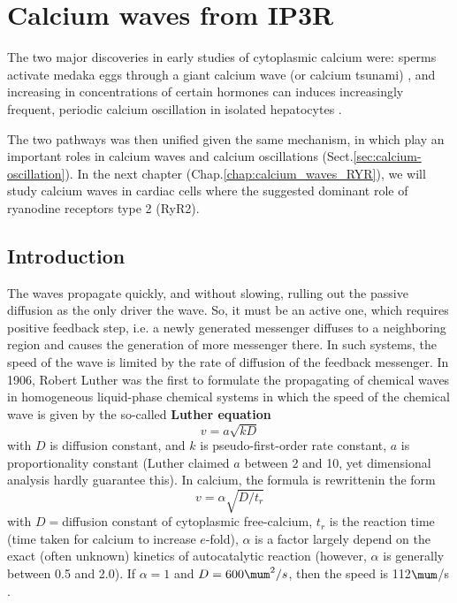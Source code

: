 \chapter{Calcium waves from IP3R}
\label{chap:calcium_waves_IP3R}

The two major discoveries in early studies of cytoplasmic calcium were:
sperms activate medaka eggs through a giant calcium wave (or calcium tsunami)
\citep{gilkey1978}, and increasing in concentrations of certain hormones can
induces increasingly frequent, periodic calcium oscillation in isolated
hepatocytes \citep{woods1986, woods1987}. 

The two pathways was then unified given the same mechanism, in which \IPthree
play an important roles in calcium waves and calcium oscillations
(Sect.\ref{sec:calcium-oscillation}). In the next chapter
(Chap.\ref{chap:calcium_waves_RYR}), we will study calcium waves in cardiac
cells where the suggested dominant role of ryanodine receptors type 2 (RyR2).

\section{Introduction}


The waves propagate quickly, and without slowing, rulling out the passive
diffusion as the only driver the wave. So, it must be an active one, which
requires positive feedback step, i.e. a newly generated messenger diffuses to a
neighboring region and causes the generation of more messenger there. In such
systems, the speed of the wave is limited by the rate of diffusion of the
feedback messenger. In 1906, Robert Luther was the first to formulate the
propagating of chemical waves in homogeneous liquid-phase chemical systems
\citep{luther1906, showalter1987} in which the speed of the chemical wave is
given by the so-called {\bf Luther equation}
\begin{equation}
v = a\sqrt{kD}
\end{equation}
with $D$ is diffusion constant, and $k$ is pseudo-first-order rate constant, $a$
is proportionality constant (Luther claimed $a$ between 2 and 10, yet
dimensional analysis hardly guarantee this). In calcium, the formula is
rewrittenin the form
\begin{equation}
v = \alpha \sqrt{D/t_r}
\end{equation}
with $D=$diffusion constant of cytoplasmic free-calcium, $t_r$ is the reaction
time (time taken for calcium to increase $e$-fold), $\alpha$ is a factor largely
depend on the exact (often unknown) kinetics of autocatalytic reaction
(however, $\alpha$ is generally between 0.5 and 2.0). If $\alpha=1$ and $D=600
\mum^2/s$, then the speed is 112$\mum$/s \citep{jaffe1991}. 

